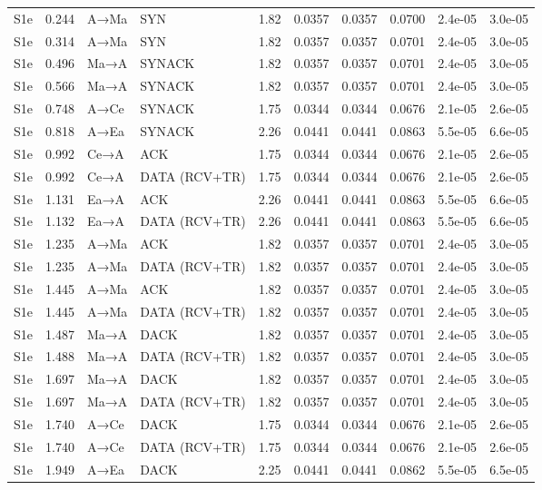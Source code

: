 \documentclass[10pt,letterpaper]{article}
\begin{document}
{\begin{longtable}{@{}lrllrrrrrr@{}}
S1e & 0.244 & A→Ma & SYN & 1.82 & 0.0357 & 0.0357 & 0.0700 & 2.4e-05 & 3.0e-05 \\
S1e & 0.314 & A→Ma & SYN & 1.82 & 0.0357 & 0.0357 & 0.0701 & 2.4e-05 & 3.0e-05 \\
S1e & 0.496 & Ma→A & SYNACK & 1.82 & 0.0357 & 0.0357 & 0.0701 & 2.4e-05 & 3.0e-05 \\
S1e & 0.566 & Ma→A & SYNACK & 1.82 & 0.0357 & 0.0357 & 0.0701 & 2.4e-05 & 3.0e-05 \\
S1e & 0.748 & A→Ce & SYNACK & 1.75 & 0.0344 & 0.0344 & 0.0676 & 2.1e-05 & 2.6e-05 \\
S1e & 0.818 & A→Ea & SYNACK & 2.26 & 0.0441 & 0.0441 & 0.0863 & 5.5e-05 & 6.6e-05 \\
S1e & 0.992 & Ce→A & ACK & 1.75 & 0.0344 & 0.0344 & 0.0676 & 2.1e-05 & 2.6e-05 \\
S1e & 0.992 & Ce→A & DATA (RCV+TR) & 1.75 & 0.0344 & 0.0344 & 0.0676 & 2.1e-05 & 2.6e-05 \\
S1e & 1.131 & Ea→A & ACK & 2.26 & 0.0441 & 0.0441 & 0.0863 & 5.5e-05 & 6.6e-05 \\
S1e & 1.132 & Ea→A & DATA (RCV+TR) & 2.26 & 0.0441 & 0.0441 & 0.0863 & 5.5e-05 & 6.6e-05 \\
S1e & 1.235 & A→Ma & ACK & 1.82 & 0.0357 & 0.0357 & 0.0701 & 2.4e-05 & 3.0e-05 \\
S1e & 1.235 & A→Ma & DATA (RCV+TR) & 1.82 & 0.0357 & 0.0357 & 0.0701 & 2.4e-05 & 3.0e-05 \\
S1e & 1.445 & A→Ma & ACK & 1.82 & 0.0357 & 0.0357 & 0.0701 & 2.4e-05 & 3.0e-05 \\
S1e & 1.445 & A→Ma & DATA (RCV+TR) & 1.82 & 0.0357 & 0.0357 & 0.0701 & 2.4e-05 & 3.0e-05 \\
S1e & 1.487 & Ma→A & DACK & 1.82 & 0.0357 & 0.0357 & 0.0701 & 2.4e-05 & 3.0e-05 \\
S1e & 1.488 & Ma→A & DATA (RCV+TR) & 1.82 & 0.0357 & 0.0357 & 0.0701 & 2.4e-05 & 3.0e-05 \\
S1e & 1.697 & Ma→A & DACK & 1.82 & 0.0357 & 0.0357 & 0.0701 & 2.4e-05 & 3.0e-05 \\
S1e & 1.697 & Ma→A & DATA (RCV+TR) & 1.82 & 0.0357 & 0.0357 & 0.0701 & 2.4e-05 & 3.0e-05 \\
S1e & 1.740 & A→Ce & DACK & 1.75 & 0.0344 & 0.0344 & 0.0676 & 2.1e-05 & 2.6e-05 \\
S1e & 1.740 & A→Ce & DATA (RCV+TR) & 1.75 & 0.0344 & 0.0344 & 0.0676 & 2.1e-05 & 2.6e-05 \\
S1e & 1.949 & A→Ea & DACK & 2.25 & 0.0441 & 0.0441 & 0.0862 & 5.5e-05 & 6.5e-05 \\

\end{longtable}}
\end{document}
